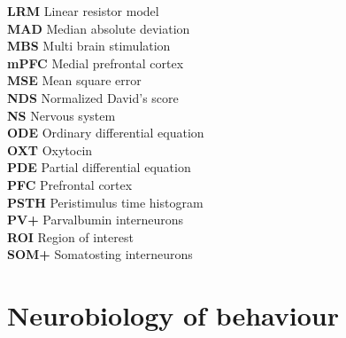 \documentclass[12pt, a4paper]{report}
\begin{document}
\noindent
\textbf{LRM} Linear resistor model \\

\noindent
\textbf{MAD} Median absolute deviation \\

\noindent
\textbf{MBS} Multi brain stimulation \\

\noindent
\textbf{mPFC} Medial prefrontal cortex \\

\noindent
\textbf{MSE} Mean square error \\

\noindent
\textbf{NDS} Normalized David's score \\

\noindent
\textbf{NS} Nervous system \\

\noindent
\textbf{ODE} Ordinary differential equation \\

\noindent
\textbf{OXT} Oxytocin \\

\noindent
\textbf{PDE} Partial differential equation \\

\noindent
\textbf{PFC} Prefrontal cortex \\

\noindent
\textbf{PSTH} Peristimulus time histogram \\

\noindent
\textbf{PV+} Parvalbumin interneurons \\

\noindent
\textbf{ROI} Region of interest \\

\noindent
\textbf{SOM+} Somatosting interneurons \\







\listoffigures

\listoftables

\tableofcontents
	

	
	\newpage
	
	\chapter{Neurobiology of behaviour} \label{section 1.1}
	
\end{document}
